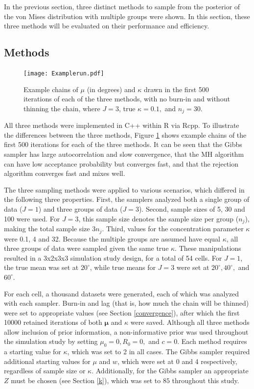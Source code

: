 \documentclass[]{gSCS2e}
\theoremstyle{plain}
\theoremstyle{definition}
\theoremstyle{remark}
\begin{document}
In the previous section, three distinct methods to sample from the posterior of the von Mises distribution with multiple groups were shown. In this section, these three methods will be evaluated on their performance and efficiency. 

\subsection{Methods}

\begin{figure}[bt]
\centering
\texttt{[image: Examplerun.pdf]}
\caption{Example chains of $\mu$ (in degrees) and $\kappa$ drawn in the first 500 iterations of each of the three methods, with no burn-in and without thinning the chain, where $J = 3$, true $\kappa = 0.1,$ and $n_j = 30$.}
\label{example}
\end{figure}

All three methods were implemented in C++ within R \cite{team2013r} via Rcpp.\cite{rcpp} To illustrate the differences between the three methods, Figure \ref{example} shows example chains of the first 500 iterations for each of the three methods. It can be seen that the Gibbs sampler has large autocorrelation and slow convergence, that the MH algorithm can have low acceptance probability but converges fast, and that the rejection algorithm converges fast and mixes well. 

The three sampling methods were applied to various scenarios, which differed in the following three properties. First, the samplers  analyzed both a single group of data ($J=1$) and three groups of data ($J=3$). Second, sample sizes of 5, 30 and 100 were used. For $J=3$, this sample size denotes the sample size per group ($n_j$), making the total sample size $3n_j$. Third, values for the concentration parameter $\kappa$ were 0.1, 4 and 32. Because the multiple groups are assumed have equal $\kappa$, all three groups of data were sampled given the same true $\kappa$. These manipulations resulted in a 3x2x3x3 simulation study design, for a total of 54 cells. For $J=1$, the true mean was set at $20^\circ$, while true means for $J=3$ were set at $20^\circ, 40^\circ,$ and $60^\circ$.

For each cell, a thousand datasets were generated, each of which was analyzed with each sampler. Burn-in and lag (that is, how much the chain will be thinned) were set to appropriate values (see Section \ref{convergence}), after which the first 10000 retained iterations of both $\boldsymbol\mu$ and $\kappa$ were saved. Although all three methods allow inclusion of prior information, a non-informative prior was used throughout the simulation study by setting $\mu_0=0, R_0=0,$ and $c=0$. Each method requires a starting value for $\kappa$, which was set to 2 in all cases. The Gibbs sampler required additional starting values for $\mu$ and $w$, which were set at 0 and 4 respectively, regardless of sample size or $\kappa$. Additionally, for the Gibbs sampler an appropriate $Z$ must be chosen (see Section \ref{k}), which was set to $85$ throughout this study. 
\end{document}
